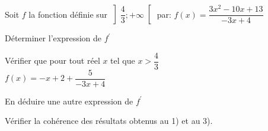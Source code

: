 \documentclass[12pt,a4paper]{article}  %
\begin{document}
Soit $f$ la fonction définie sur $\left] \dfrac{4}{3} ;+\infty\right[$ par: $f(x)=\dfrac{3 x^{2}-10x+13}{-3 x+4}$
\begin{enumMet}
	\item Déterminer l'expression de $f^{\prime}$
	\item Vérifier que pour tout réel $x$ tel que $x>\dfrac{4}{3}$\\ $f(x)=-x+2+\dfrac{5}{-3 x+4}$
	\item En déduire une autre expression de $f^{\prime}$
	\item Vérifier la cohérence des résultats obtenus au 1) et au 3).
\end{enumMet}
\end{document}
